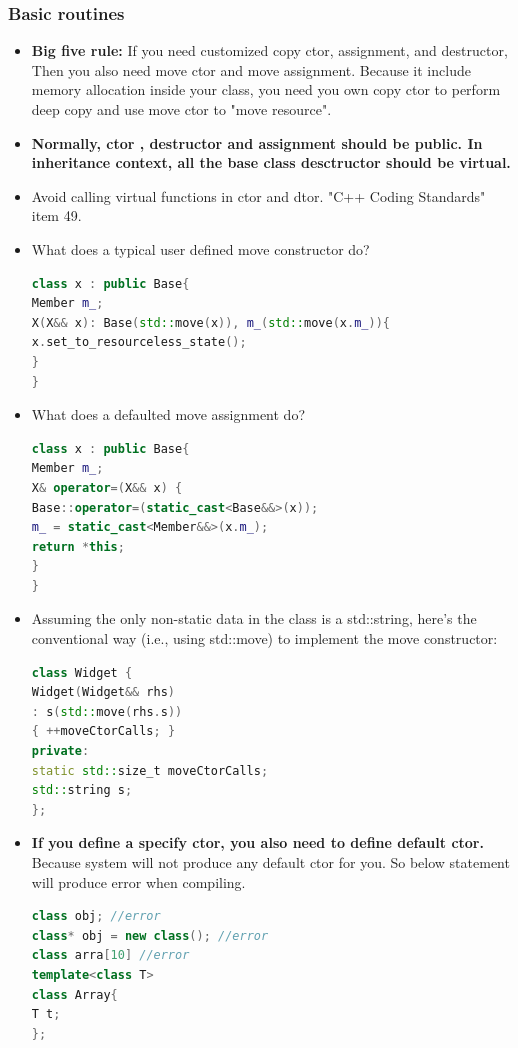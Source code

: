 \documentclass[a4paper,12pt,twoside]{book}
\begin{document}
\subsubsection{Basic routines}
\begin{itemize}
\item \textbf{Big five rule:} If you need customized copy ctor, assignment, and destructor, Then you also need move ctor and move assignment. Because it include memory allocation inside your class, you need you own copy ctor to perform deep copy and use move ctor to "move resource".

\item \textbf{Normally, ctor , destructor and assignment should be public. In inheritance context, all the base class desctructor should be virtual. }

\item Avoid calling virtual functions in ctor and dtor. "C++ Coding Standards" item 49.

\item What does a typical user defined move constructor do?
\begin{lstlisting}[frame=single, language=c++]
class x : public Base{
Member m_;
X(X&& x): Base(std::move(x)), m_(std::move(x.m_)){
x.set_to_resourceless_state();
}
}
\end{lstlisting}

\item What does a defaulted move assignment do?
\begin{lstlisting}[frame=single, language=c++]
class x : public Base{
Member m_;
X& operator=(X&& x) {
Base::operator=(static_cast<Base&&>(x));
m_ = static_cast<Member&&>(x.m_);
return *this;
}
}
\end{lstlisting}



\item Assuming the only non-static data in the class is a std::string, here's the conventional way (i.e., using std::move) to implement the move constructor:
\begin{lstlisting}[frame=single, language=c++]
class Widget {
Widget(Widget&& rhs)
: s(std::move(rhs.s))
{ ++moveCtorCalls; }
private:
static std::size_t moveCtorCalls;
std::string s;
};
\end{lstlisting}

\item \textbf{If you define a specify ctor, you also need to define default ctor.} Because system will not produce any default ctor for you. So below statement will produce error when compiling.
\begin{lstlisting}[frame=single, language=c++]
class obj; //error
class* obj = new class(); //error
class arra[10] //error
template<class T>
class Array{
T t;
};


\end{lstlisting}
\end{itemize}
\end{document}
